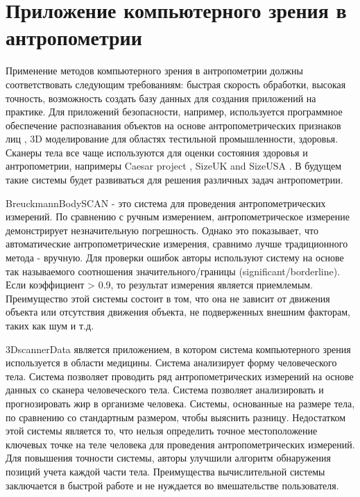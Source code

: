 \section{Приложение компьютерного зрения в антропометрии}

Применение методов компьютерного зрения в антропометрии должны соответствовать следующим требованиям: быстрая скорость обработки, высокая точность, возможность создать базу данных для создания приложений на практике. Для приложений безопасности, например, используется программное обеспечение распознавания объектов на основе антропометрических признаков лиц \cite{Graham1997}, 3D моделирование \cite{Zouhour2006} для областях тестильной промышленности, здоровья. Сканеры тела все чаще используются для оценки состояния здоровья и антропометрии, напримеры Caesar project \cite{Robinette2006}, SizeUK \cite{Uk2013} and SizeUSA \cite{Usa2013}. В будущем такие системы будет развиваться для решения различных задач антропометрии.

BreuckmannBodySCAN \cite{Hexagon2016} - это система для проведения антропометрических измерений. По сравнению с ручным измерением, антропометрическое измерение демонстрирует незначительную погрешность. Однако это показывает, что автоматические антропометрические измерения, сравнимо лучше традиционного метода - вручную. Для проверки ошибок авторы используют систему на основе так называемого соотношения значительного/границы (significant/borderline). Если коэффициент > 0.9, то результат измерения является приемлемым. Преимущество этой системы состоит в том, что она не зависит от движения объекта или отсутствия движения объекта, не подверженных внешним факторам, таких как шум и т.д.

3DscannerData \cite{Sobota2009} является приложением, в котором система компьютерного зрения используется в области медицины. Система анализирует форму человеческого тела. Система позволяет проводить ряд антропометрических измерений на основе данных со сканера человеческого тела. Система позволяет анализировать и прогнозировать жир в организме человека. Системы, основанные на размере тела, по сравнению со стандартным размером, чтобы выяснить разницу. Недостатком этой системы является то, что нельзя определить точное местоположение ключевых точке на теле человека для проведения антропометрических измерений. Для повышения точности системы, авторы улучшили алгоритм обнаружения позиций учета каждой части тела. Преимущества вычислительной системы заключается в быстрой работе и не нуждается во вмешательстве  пользователя.

